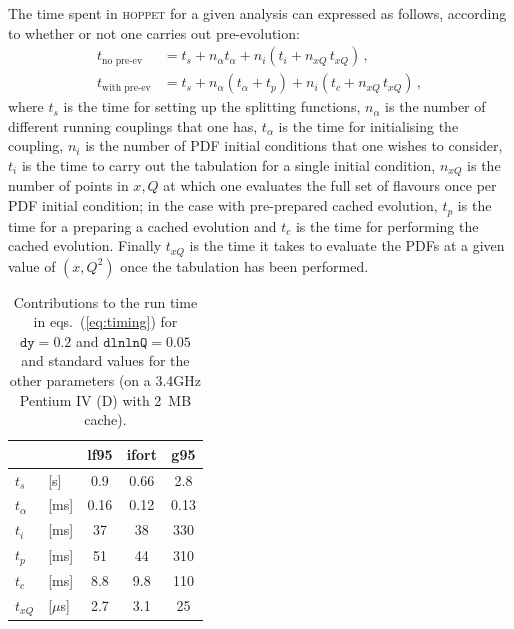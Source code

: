 \documentclass[12pt]{article}
\newcommand{\dy}{\ttt{dy}}
\newcommand{\dlnlnQ}{\ttt{dlnlnQ}}
\newcommand{\hoppet}{\textsc{hoppet}\xspace}
\newcommand{\ttt}[1]{\texttt{#1}}
\begin{document}
The time spent in \hoppet for a given analysis can expressed as
follows, according to whether or not one carries out pre-evolution:
\begin{subequations}
  \label{eq:timing}
  \begin{align}
    t_\text{no pre-ev}   &= t_s + n_\alpha t_\alpha + n_i (t_i  + n_{xQ}\, t_{xQ})\,,\\
    t_\text{with pre-ev} &= t_s + n_\alpha (t_\alpha + t_p) + n_i (t_c + n_{xQ}\,
    t_{xQ})\,,
  \end{align}
\end{subequations}
where $t_s$ is the time for setting up the splitting functions,
$n_\alpha$ is the number of different running couplings that one has,
$t_\alpha$ is the time for initialising the coupling,
%
$n_i$ is the number of PDF initial conditions that one wishes to
consider, $t_i$ is the time to carry out the tabulation for a single
initial condition, $n_{xQ}$ is the number of points in $x,Q$ at which
one evaluates the full set of flavours once per PDF initial condition;
in the case with pre-prepared cached evolution, $t_p$ is the time for a
preparing a cached evolution and $t_c$ is the time for performing the
cached evolution. Finally $t_{xQ}$ is the time it takes to evaluate
the PDFs at a given value of $(x,Q^2)$ once the tabulation has
been performed.

\begin{table}
  \centering
  \begin{tabular}{|ll|c|c|c|}\hline
          &&     lf95  &  ifort   & g95    \\\hline
   $t_s$ &[s]  &  0.9  &  0.66    & 2.8    \\
   $t_\alpha$ & [ms]                
               &  0.16 &  0.12    & 0.13   \\
   $t_i$ &[ms] &  37   &   38     & 330    \\
   $t_p$ &[ms] &  51   &   44     & 310    \\
   $t_c$ &[ms] &  8.8  &   9.8    & 110    \\
   $t_{xQ}$ &[$\mu$s]           
               &  2.7  &   3.1    &  25    \\
   \hline
  \end{tabular}
  \caption{Contributions to the run time in eqs.~(\ref{eq:timing})
 for    $\dy=0.2$ and 
    $\dlnlnQ=0.05$ and standard values for the other parameters 
    (on a 3.4GHz Pentium IV (D) with 2~MB cache).}
  \label{tab:timings}
\end{table}
\end{document}
